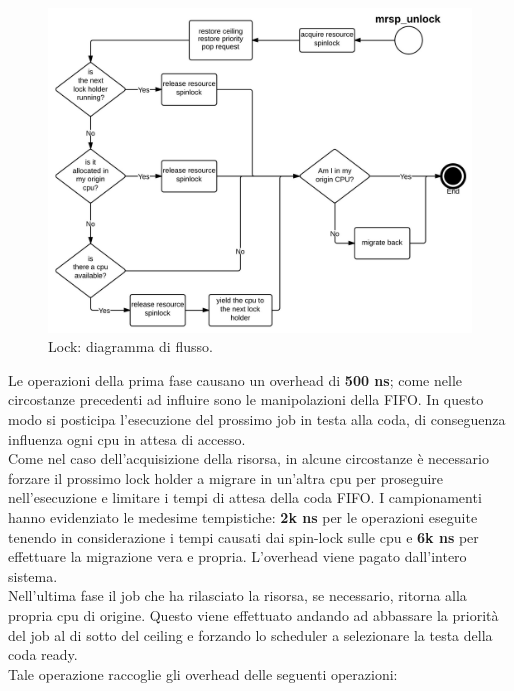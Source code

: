 \begin{figure}
\includegraphics[width=\linewidth]{images/mrsp_unlock.jpeg}
\caption{Lock: diagramma di flusso.}
\label{fig:mrsplock}
\end{figure}

\noindent Le operazioni della prima fase causano un overhead di \textbf{500 ns}; come nelle circostanze precedenti ad influire sono le manipolazioni della FIFO. In questo modo si posticipa l'esecuzione del prossimo job in testa alla coda, di conseguenza influenza ogni cpu in attesa di accesso.\\

\noindent Come nel caso dell'acquisizione della risorsa, in alcune circostanze è necessario forzare il prossimo lock holder a migrare in un'altra cpu per proseguire nell'esecuzione e limitare i tempi di attesa della coda FIFO. I campionamenti hanno evidenziato le medesime tempistiche: \textbf{2k ns} per le operazioni eseguite tenendo in considerazione i tempi causati dai spin-lock sulle cpu e \textbf{6k ns} per effettuare la migrazione vera e propria. L'overhead viene pagato dall'intero sistema.\\

\noindent Nell'ultima fase il job che ha rilasciato la risorsa, se necessario, ritorna alla propria cpu di origine. Questo viene effettuato andando ad abbassare la priorità del job al di sotto del ceiling e forzando lo scheduler a selezionare la testa della coda ready.\\

\noindent Tale operazione raccoglie gli overhead delle seguenti operazioni:

